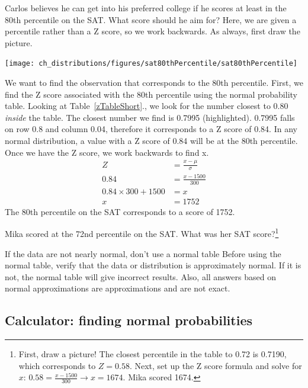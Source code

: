 \begin{example}{Carlos believes he can get into his preferred college if he scores at least in the 80th percentile on the SAT. What score should he aim for?}
Here, we are given a percentile rather than a Z score, so we work backwards. As always, first draw the picture.
\begin{center}
\texttt{[image: ch\_distributions/figures/sat80thPercentile/sat80thPercentile]}
\end{center}
We want to find the observation that corresponds to the 80th percentile. First, we find the Z score associated with the 80th percentile using the normal probability table. Looking at Table~\ref{zTableShort}., we look for the number closest to 0.80 \emph{inside} the table. The closest number we find is 0.7995 (highlighted). 0.7995 falls on row 0.8 and column 0.04, therefore it corresponds to a Z score of 0.84. In any normal distribution, a value with a Z score of 0.84 will be at the 80th percentile. Once we have the Z score, we work backwards to find x.
\begin{align*}
Z &= \frac{x-\mu}{\sigma} \\
0.84 &= \frac{x-1500}{300} \\
0.84 \times 300+1500 &= x \\
x& = 1752
\end{align*}
The 80th percentile on the SAT corresponds to a score of 1752.
\end{example}

\begin{exercise}Mika scored at the 72nd percentile on the SAT. What was her SAT score?\footnote{First, draw a picture! The closest percentile in the table to 0.72 is 0.7190, which corresponds to $Z = 0.58$. Next, set up the Z score formula and solve for $x$: $0.58 = \frac{x-1500}{300} \rightarrow x = 1674$. Mika scored 1674.}
\end{exercise}

\begin{caution}{If the data are not nearly normal, don't use a normal table}{
Before using the normal table, verify that the data or distribution is approximately normal. If it is not, the normal table will give incorrect results. Also, all answers based on normal approximations are approximations and are not exact.}
\end{caution}



\subsection{Calculator: finding normal probabilities}
\label{TInormal}

